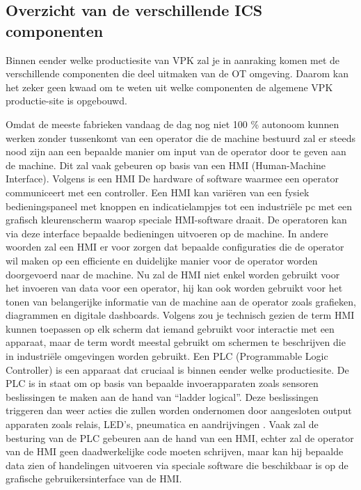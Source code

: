 \subsection{Overzicht van de verschillende ICS componenten}
Binnen eender welke productiesite van VPK zal je in aanraking komen met de verschillende componenten die deel uitmaken van de OT omgeving. Daarom kan het zeker geen kwaad om te weten uit welke componenten de algemene VPK productie-site is opgebouwd. 

Omdat de meeste fabrieken vandaag de dag nog niet 100 \% autonoom kunnen werken zonder tussenkomt van een operator die de machine bestuurd zal er steeds nood zijn aan een bepaalde manier om input van de operator door te geven aan de machine. Dit zal vaak gebeuren op basis van een HMI (Human-Machine Interface). 
Volgens \textcite{Nist2025} is een HMI De hardware of software waarmee een operator communiceert met een controller. Een HMI kan variëren van een fysiek bedieningspaneel met knoppen en indicatielampjes tot een industriële pc met een grafisch kleurenscherm waarop speciale HMI-software draait. De operatoren kan via deze interface bepaalde bedieningen uitvoeren op de machine. In andere woorden zal een HMI er voor zorgen dat bepaalde configuraties die de operator wil maken op een efficiente en duidelijke manier voor de operator worden doorgevoerd naar de machine. 
Nu zal de HMI niet enkel worden gebruikt voor het invoeren van data voor een operator, hij kan ook worden gebruikt voor het tonen van belangerijke informatie van de machine aan de operator zoals grafieken, diagrammen en digitale dashboards. \autocite{Inductive2025}
Volgens \textcite{Copadata2025} zou je technisch gezien de term HMI kunnen toepassen op elk scherm dat iemand gebruikt voor interactie met een apparaat, maar de term wordt meestal gebruikt om schermen te beschrijven die in industriële omgevingen worden gebruikt. 
Een PLC (Programmable Logic Controller) is een apparaat dat cruciaal is binnen eender welke productiesite. De PLC is in staat om op basis van bepaalde invoerapparaten zoals sensoren beslissingen te maken aan de hand van “ladder logical”. Deze beslissingen triggeren dan weer acties die zullen worden ondernomen door aangesloten output apparaten zoals relais, LED’s, pneumatica en aandrijvingen \autocite{unitronics2025}.
Vaak zal de besturing van de PLC gebeuren aan de hand van een HMI, echter zal de operator van de HMI geen daadwerkelijke code moeten schrijven, maar kan hij bepaalde data zien of handelingen uitvoeren via speciale software die beschikbaar is op de grafische gebruikersinterface van de HMI. 
